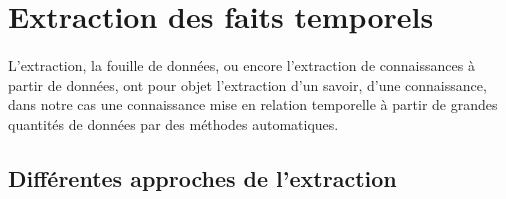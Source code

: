 \section{Extraction des faits temporels}
\paragraph{}
L'extraction, la fouille de données, ou encore l'extraction de connaissances à partir de données, ont pour objet l'extraction d'un savoir, d'une connaissance, dans notre cas une connaissance mise en relation temporelle à partir de grandes quantités de données par des méthodes automatiques.
\subsection{Différentes approches de l'extraction }
